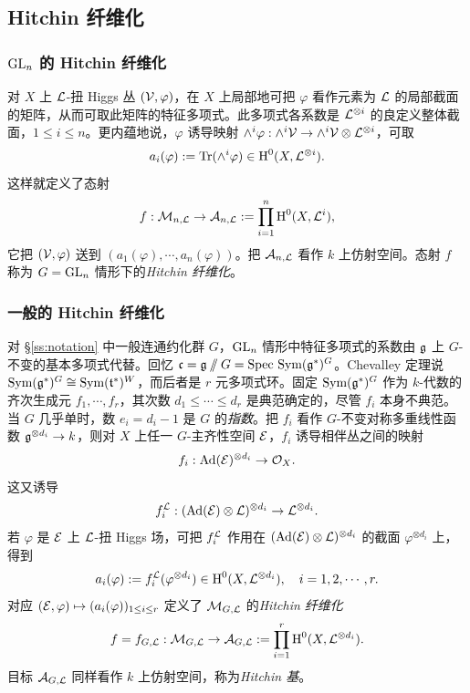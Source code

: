 \subsection{Hitchin 纤维化}

\subsubsection{$\textup{GL}_{n}$ 的 Hitchin 纤维化}
对 $X$ 上 $\mathcal{L}$-扭 Higgs 丛 $(\mathcal{V},\varphi)$，在 $X$ 上局部地可把 $\varphi$ 看作元素为 $\mathcal{L}$ 的局部截面的矩阵，从而可取此矩阵的特征多项式。此多项式各系数是 $\mathcal{L}^{\otimes i}$ 的良定义整体截面，$1\leq i\leq n$。更内蕴地说，$\varphi$ 诱导映射 $\wedge^{i}\varphi:\wedge^{i}\mathcal{V}\to\wedge^{i}\mathcal{V}\otimes\mathcal{L}^{\otimes i}$，可取
\begin{equation*}
a_{i}(\varphi):=\textup{Tr}(\wedge^{i}\varphi)\in\textup{H}^{0}({X,\mathcal{L}^{\otimes i}}).
\end{equation*}
这样就定义了态射
\begin{equation*}
f: \mathcal{M}_{n,\mathcal{L}}\to\mathcal{A}_{n,\mathcal{L}}:=\prod_{i=1}^{n}\textup{H}^{0}({X,\mathcal{L}^{i}}),
\end{equation*}
它把 $(\mathcal{V},\varphi)$ 送到 $(a_{1}(\varphi),\cdots, a_{n}(\varphi))$。把 $\mathcal{A}_{n,\mathcal{L}}$ 看作 $k$ 上仿射空间。态射 $f$ 称为 $G=\textup{GL}_{n}$ 情形下的{\em Hitchin 纤维化}。

\subsubsection{一般的 Hitchin 纤维化}\label{sss:Hit fib general} 对 \S\ref{ss:notation} 中一般连通约化群 $G$，$\textup{GL}_{n}$ 情形中特征多项式的系数由 $\mathfrak{g}$ 上 $G$-不变的基本多项式代替。回忆 $\mathfrak{c}=\mathfrak{g}\sslash G=\textup{Spec}\ \textup{Sym}(\mathfrak{g}^{*})^{G}$。Chevalley 定理说 $\textup{Sym}(\mathfrak{g}^{*})^{G}\cong\textup{Sym}(\mathfrak{t}^{*})^{W}$，而后者是 $r$ 元多项式环。固定 $\textup{Sym}(\mathfrak{g}^{*})^{G}$ 作为 $k$-代数的齐次生成元 $f_{1},\cdots, f_{r}$，其次数 $d_{1}\leq \cdots \leq d_{r}$ 是典范确定的，尽管 $f_{i}$ 本身不典范。当 $G$ 几乎单时，数 $e_{i}=d_{i}-1$ 是 $G$ 的{\em 指数}。把 $f_{i}$ 看作 $G$-不变对称多重线性函数 $\mathfrak{g}^{\otimes d_{i}}\to k$，则对 $X$ 上任一 $G$-主齐性空间 $\mathcal{E}$，$f_{i}$ 诱导相伴丛之间的映射
\begin{equation*}
f_{i}: \textup{Ad}(\mathcal{E})^{\otimes d_{i}}\to\mathcal{O}_{X}.
\end{equation*}
这又诱导
\begin{equation*}
f^{\mathcal{L}}_{i}:(\textup{Ad}(\mathcal{E})\otimes\mathcal{L})^{\otimes d_{i}}\to\mathcal{L}^{\otimes d_{i}}.
\end{equation*}
若 $\varphi$ 是 $\mathcal{E}$ 上 $\mathcal{L}$-扭 Higgs 场，可把 $f^{\mathcal{L}}_{i}$ 作用在 $(\textup{Ad}(\mathcal{E})\otimes\mathcal{L})^{\otimes d_{i}}$ 的截面 $\varphi^{\otimes d_{i}}$ 上，得到
\begin{equation*}
a_{i}(\varphi):=f^{\mathcal{L}}_{i}(\varphi^{\otimes d_{i}})\in\textup{H}^{0}({X,\mathcal{L}^{\otimes d_{i}}}),  \quad i=1,2,\cdots, r.
\end{equation*}
对应 $(\mathcal{E},\varphi)\mapsto(a_{i}(\varphi))_{1\leq i\leq r}$ 定义了 $\mathcal{M}_{G,\mathcal{L}}$ 的{\em Hitchin 纤维化}
\begin{equation*}
f=f_{G,\mathcal{L}}: \mathcal{M}_{G,\mathcal{L}}\to \mathcal{A}_{G,\mathcal{L}}:=\prod_{i=1}^{r}\textup{H}^{0}({X,\mathcal{L}^{\otimes d_{i}}}).
\end{equation*}
目标 $\mathcal{A}_{G,\mathcal{L}}$ 同样看作 $k$ 上仿射空间，称为{\em Hitchin 基}。

